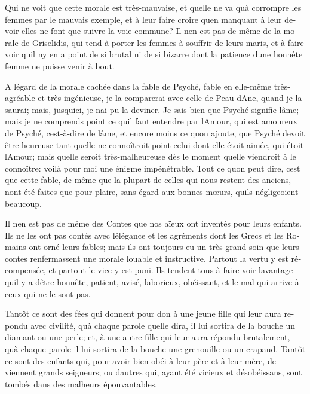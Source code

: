 \documentclass[14pt,a4paper]{memoir}
\begin{document}
\begin{otherlanguage}{french}
Qui ne voit que cette morale est très-mauvaise, et
qu\textquotesingle elle ne va qu\textquotesingle à corrompre les femmes
par le mauvais exemple, et à leur faire croire qu\textquotesingle en
manquant à leur devoir elles ne font que suivre la voie commune? Il
n\textquotesingle en est pas de même de la morale de Griselidis, qui
tend à porter les femmes à souffrir de leurs maris, et à faire voir
qu\textquotesingle il n\textquotesingle y en a point de si brutal ni de
si bizarre dont la patience d\textquotesingle une honnête femme ne
puisse venir à bout.

A l\textquotesingle égard de la morale cachée dans la fable de Psyché,
fable en elle-même très-agréable et très-ingénieuse, je la comparerai
avec celle de Peau d\textquotesingle Ane, quand je la saurai; mais,
jusqu\textquotesingle ici, je n\textquotesingle ai pu la deviner. Je
sais bien que Psyché signifie l\textquotesingle âme; mais je ne
comprends point ce qu\textquotesingle il faut entendre par
l\textquotesingle Amour, qui est amoureux de Psyché,
c\textquotesingle est-à-dire de l\textquotesingle âme, et encore moins
ce qu\textquotesingle on ajoute, que Psyché devoit être heureuse tant
qu\textquotesingle elle ne connoîtroit point celui dont elle étoit
aimée, qui étoit l\textquotesingle Amour; mais qu\textquotesingle elle
seroit très-malheureuse dès le moment qu\textquotesingle elle viendroit
à le connoître: voilà pour moi une énigme impénétrable. Tout ce
qu\textquotesingle on peut dire, c\textquotesingle est que cette fable,
de même que la plupart de celles qui nous restent des anciens,
n\textquotesingle ont été faites que pour plaire, sans égard aux bonnes
mœurs, qu\textquotesingle ils négligeoient beaucoup.

Il n\textquotesingle en est pas de même des Contes que nos aïeux ont
inventés pour leurs enfants. Ils ne les ont pas contés avec
l\textquotesingle élégance et les agréments dont les Grecs et les
Romains ont orné leurs fables; mais ils ont toujours eu un très-grand
soin que leurs contes renfermassent une morale louable et instructive.
Partout la vertu y est récompensée, et partout le vice y est puni. Ils
tendent tous à faire voir l\textquotesingle avantage
qu\textquotesingle il y a d\textquotesingle être honnête, patient,
avisé, laborieux, obéissant, et le mal qui arrive à ceux qui ne le sont
pas.

Tantôt ce sont des fées qui donnent pour don à une jeune fille qui leur
aura repondu avec civilité, qu\textquotesingle à chaque parole
qu\textquotesingle elle dira, il lui sortira de la bouche un diamant ou
une perle; et, à une autre fille qui leur aura répondu brutalement,
qu\textquotesingle à chaque parole il lui sortira de la bouche une
grenouille ou un crapaud. Tantôt ce sont des enfants qui, pour avoir
bien obéi à leur père et à leur mère, deviennent grands seigneurs; ou
d\textquotesingle autres qui, ayant été vicieux et désobéissans, sont
tombés dans des malheurs épouvantables.


\end{otherlanguage}
\end{document}
